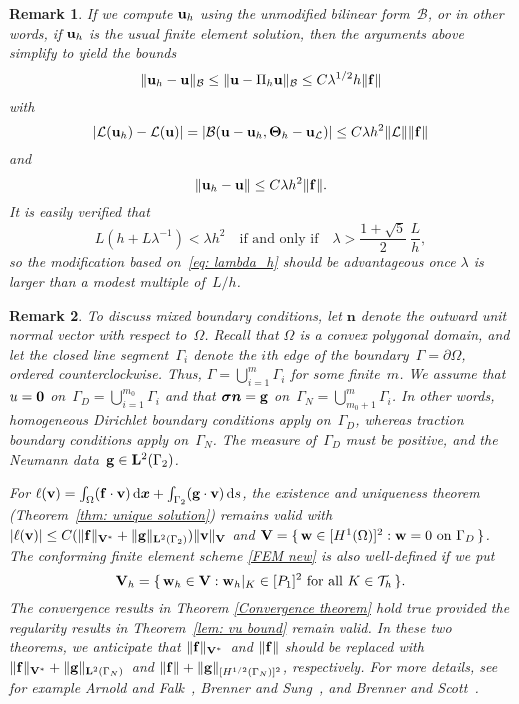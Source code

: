 \documentclass[11pt]{article}
\newcommand{\calB}{\mathcal{B}}
\newcommand{\calL}{\mathcal{L}}
\newcommand{\vf}{{\bf f}}
\newcommand{\vu}{{\bf u}}
\newcommand{\vv}{{\bf v}}
\newcommand{\vV}{{\bf V}}
\newcommand{\vw}{{\bf w}}
\newcommand{\bsx}{{\boldsymbol{x}}}
\newcommand{\vsigma}{\boldsymbol{\sigma}}
\numberwithin{equation}{section}
\newcommand{\ud}{\mathrm{d}}
\newtheorem{remark}{Remark}[section]
\begin{document}
\begin{remark}
If we compute $\vu_h$ using the unmodified bilinear form~$\calB$, or in other
words, if $\vu_h$ is the usual finite element solution, then the arguments above
simplify to yield the bounds
\[
\|\vu_h-\vu\|_{\calB}\le\|\vu-\Pi_h\vu\|_{\calB}
\le C\lambda^{1/2}h\|\vf\|
\]
with
\[
|\calL(\vu_h)-\calL(\vu)|=|\calB(\vu-\vu_h,\mathbf{\Theta}_h-\vu_{\calL})|
    \le C\lambda h^2\|\calL\|\|\vf\|
\]
and
\[
\|\vu_h-\vu\|\le C\lambda h^2\|\vf\|.
\]
It is easily verified that
\[
L(h+L\lambda^{-1})<\lambda h^2\quad\text{if and only if}\quad
\lambda>\frac{1+\sqrt{5}}{2}\,\frac{L}{h},
\]
so the modification based on~\eqref{eq: lambda_h} should be
advantageous once $\lambda$ is larger than a modest multiple of~$L/h$.
\end{remark}
\begin{remark}
To discuss mixed boundary conditions, let $\boldsymbol{n}$ denote the outward 
unit normal vector with respect to~$\Omega$. Recall that $\Omega$ is a convex polygonal domain, and let the 
closed line segment~$\Gamma_i$ denote the $i$th edge of the boundary~$\Gamma=\partial\Omega$, ordered 
counterclockwise.  Thus, $\Gamma=\bigcup_{i=1}^m \Gamma_i$ for some finite~$m$. We assume  that 
$u={\bf 0}$ on~$\Gamma_D=\bigcup_{i=1}^{m_0} \Gamma_i$ and that $\vsigma\boldsymbol{n}={\bf g}$ 
on~$\Gamma_N=\bigcup_{m_0+1}^{m} \Gamma_i$.  In other words, homogeneous Dirichlet boundary conditions
apply on~$\Gamma_D$, whereas traction boundary conditions apply on~$\Gamma_N$. The measure of~$\Gamma_D$
must be positive, and the Neumann data~${\bf g}\in{\bf L}^2(\Gamma_2)$.

For $\ell(\vv)=\int_\Omega(\vf\cdot\vv)\,\ud\bsx+\int_{\Gamma_2}({\bf g}\cdot\vv)\,\ud s$, the 
existence and uniqueness theorem (Theorem~\ref{thm: unique solution}) remains valid with 
$|\ell(\vv)|\le C(\|\vf\|_{\vV^*}+\|{\bf g}\|_{{\bf L}^2(\Gamma_2)})\|\vv\|_{\vV}$ and
$\vV=\{\,\vw\in [H^1(\Omega)]^2:\text{$\vw=0$ on $\Gamma_D$}\,\}$. The conforming finite element scheme \eqref{FEM new} is also well-defined if we put
\[\vV_h=\{\,\vw_h\in\vV:\text{$\vw_h|_K\in[P_1]^2$ for all $K\in\mathcal{T}_h$}\,\}.\]
The convergence results in Theorem \ref{Convergence theorem} hold true provided the regularity results 
in Theorem~\ref{lem: vu bound} remain valid. In these two theorems, we anticipate that 
$\|\vf\|_{\vV^*}$~and $\|\vf\|$ should be replaced with 
$\|\vf\|_{\vV^*}+\|{\bf g}\|_{{\bf L}^2(\Gamma_N)}$~and 
$\|\vf\|+\|{\bf g}\|_{[H^{1/2}(\Gamma_N)]^2}$, respectively.  For more details, see for example Arnold and 
Falk~\cite{ArnoldFalk1987}, Brenner and Sung~\cite[Lemma 2.3]{BrennerSung1992}, and Brenner and Scott~\cite[Page 319]{BrennerScott2008}.
\end{remark}
\end{document}
